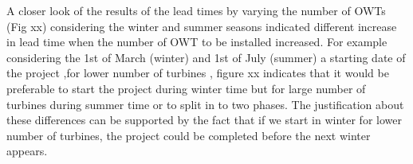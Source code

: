 A closer look of the results of the lead times by varying the number of OWTs (Fig xx) considering the winter and summer seasons indicated different increase in lead time when the number of OWT to be installed increased. For example considering the 1st of March (winter) and 1st of July (summer) a starting date of the project ,for lower number of turbines , figure xx indicates that it would be preferable to start the project during winter time but for large number of turbines during summer time or to split in to two phases. The justification about these differences can be supported by the fact that if we start in winter for lower number of turbines, the project could be completed before the next winter appears. 